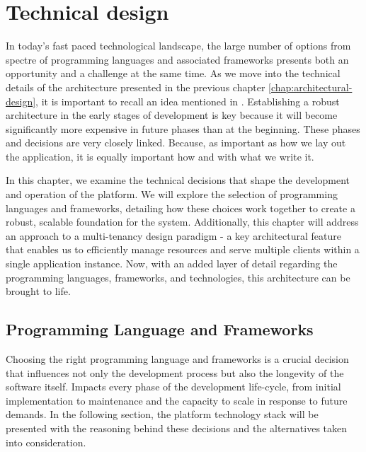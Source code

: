 \chapter{Technical design}
\label{chap:technical-design}
In today's fast paced technological landscape, the large number of options from spectre of programming languages and associated frameworks presents both an opportunity and a challenge at the same time.
As we move into the technical details of the architecture presented in the previous chapter \ref{chap:architectural-design}, it is important to recall an idea mentioned in \cite{sommervilleSW}. Establishing a robust architecture in the early stages of development is key because it will become significantly more expensive in future phases than at the beginning. 
These phases and decisions are very closely linked. 
Because, as important as how we lay out the application, it is equally important how and with what we write it.

In this chapter, we examine the technical decisions that shape the development and operation of the platform.
We will explore the selection of programming languages and frameworks, detailing how these choices work together to create a robust, scalable foundation for the system.
Additionally, this chapter will address an approach to a multi-tenancy design paradigm - a key architectural feature that enables us to efficiently manage resources and serve multiple clients within a single application instance.
Now, with an added layer of detail regarding the programming languages, frameworks, and technologies, this architecture can be brought to life. 

\section{Programming Language and Frameworks}
\label{sec:programming-language-frameworks}
Choosing the right programming language and frameworks is a crucial decision that influences not only the development process but also the longevity of the software itself.
Impacts every phase of the development life-cycle, from initial implementation to maintenance and the capacity to scale in response to future demands.
In the following section, the platform technology stack will be presented with the reasoning behind these decisions and the alternatives taken into consideration. 

